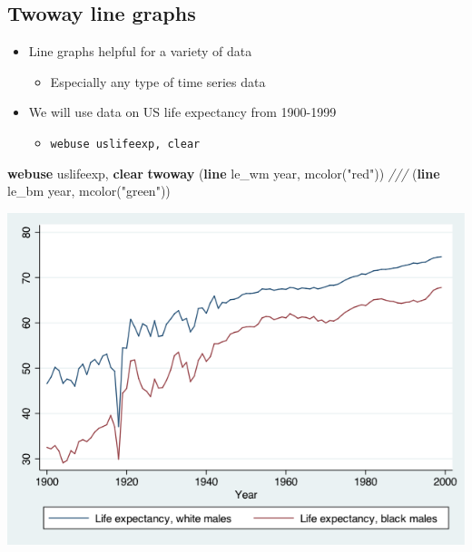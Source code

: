 \documentclass[
]{book}
\newenvironment{Shaded}{\begin{snugshade}}{\end{snugshade}}
\newcommand{\CommentTok}[1]{\textcolor[rgb]{0.56,0.35,0.01}{\textit{#1}}}
\newcommand{\FunctionTok}[1]{\textcolor[rgb]{0.00,0.00,0.00}{#1}}
\newcommand{\KeywordTok}[1]{\textcolor[rgb]{0.13,0.29,0.53}{\textbf{#1}}}
\newcommand{\NormalTok}[1]{#1}
\newcommand{\StringTok}[1]{\textcolor[rgb]{0.31,0.60,0.02}{#1}}
\providecommand{\tightlist}{%
  \setlength{\itemsep}{0pt}\setlength{\parskip}{0pt}}
\begin{document}
\hypertarget{twoway-line-graphs}{%
\subsection{Twoway line graphs}\label{twoway-line-graphs}}

\begin{itemize}
\tightlist
\item
  Line graphs helpful for a variety of data

  \begin{itemize}
  \tightlist
  \item
    Especially any type of time series data
  \end{itemize}
\item
  We will use data on US life expectancy from 1900-1999

  \begin{itemize}
  \tightlist
  \item
    \texttt{webuse\ uslifeexp,\ clear}
  \end{itemize}
\end{itemize}

\begin{Shaded}
\begin{Highlighting}[]
\KeywordTok{webuse}\NormalTok{ uslifeexp, }\KeywordTok{clear}
\KeywordTok{twoway}\NormalTok{ (}\KeywordTok{line}\NormalTok{ le\_wm }\FunctionTok{year}\NormalTok{, mcolor(}\StringTok{"red"}\NormalTok{)) }\CommentTok{///}
\NormalTok{       (}\KeywordTok{line}\NormalTok{ le\_bm }\FunctionTok{year}\NormalTok{, mcolor(}\StringTok{"green"}\NormalTok{))}
\end{Highlighting}
\end{Shaded}

\includegraphics{Stata/StataGraph/images/linegraph1.png}
\end{document}

